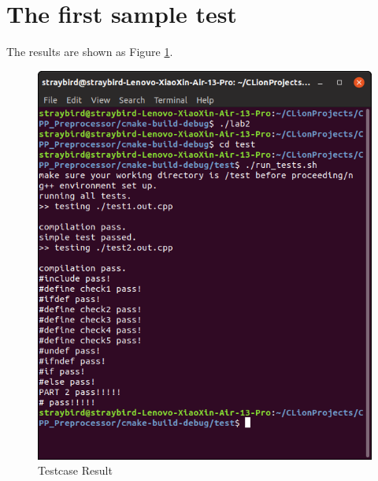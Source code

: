 \documentclass[a4paper]{report}
\begin{document}
\section{The first sample test}
The results are shown as Figure \ref{2}. 

\begin{figure}
  \centering
  \includegraphics[width=12cm]{shell.png}
  \caption{Testcase Result}\label{2}
\end{figure}
\end{document}
